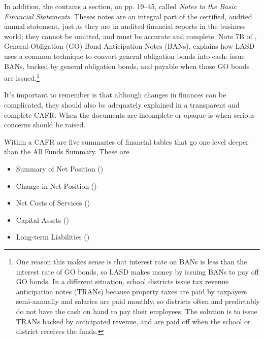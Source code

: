 In addition, the  contains a section, on pp. 19–45, called \textit{Notes to the Basic Financial Statements}. Theses notes are an integral part of the certified, audited annual statement, just as they are in audited financial reports in the business world; they cannot be omitted, and must be accurate and complete.  Note 7B of \textcite[7]{Kenyon2021}, General Obligation (GO) Bond Anticipation Notes (BANs), explains how LASD uses a common
technique to convert general obligation bonds into cash: issue BANs, backed by general obligation bonds, and payable when those GO bonds are issued.\footnote{One reason this makes sense is that interest rate on BANs is less than the interest rate of GO bonds, so LASD makes money by issuing BANs to pay off GO bonds. In a different situation, school districts issue tax revenue anticipation notes (TRANs) because property taxes are paid by taxpayers semi-annually and salaries are paid monthly, so districts often and predictably do not have the cash on hand to pay their employees. The solution is to issue TRANs backed by anticipated revenue, and are paid off when the school or district receives the funds.}

It's important to remember is that although changes in finances can be complicated, they should also be adequately explained in a transparent and complete CAFR\@. When the documents are incomplete or opaque is when serious concerns should be raised. %

Within a CAFR are five summaries of financial tables that go one level deeper than the All Funds Summary. These are
\begin{itemize}\OnehalfSpacing%
    \item Summary of Net Position ()
    \item Change in Net Position  ()
    \item Net Costs of Services   ()
    \item Capital Assets          ()
    \item Long-term Liabilities   ()
  \end{itemize}

